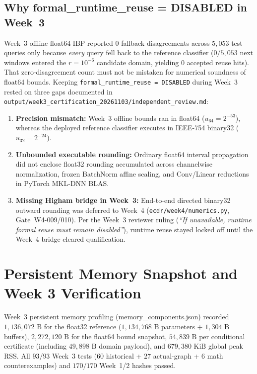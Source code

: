 \documentclass[11pt,oneside,a4paper]{report}
\newcommand{\code}[1]{{\small\upshape\ttfamily #1}}
\newcommand{\pathcode}[1]{{\small\upshape\ttfamily\nolinkurl{#1}}}
\theoremstyle{remark}
\begin{document}
\subsection{Why \code{formal\_runtime\_reuse = DISABLED} in Week~3}
Week~3 offline \code{float64} IBP reported $0$ fallback disagreements across $5{,}053$ test queries only because \emph{every} query fell back to the reference classifier ($0/5{,}053$ next windows entered the $r=10^{-6}$ candidate domain, yielding $0$ accepted reuse hits). That zero-disagreement count must not be mistaken for numerical soundness of \code{float64} bounds. Keeping \pathcode{formal_runtime_reuse = DISABLED} during Week~3 rested on three gaps documented in \pathcode{output/week3_certification_20261103/independent_review.md}:
\begin{enumerate}[leftmargin=1.5em]
  \item \textbf{Precision mismatch:} Week~3 offline bounds ran in \code{float64} ($u_{64} = 2^{-53}$), whereas the deployed reference classifier executes in IEEE-754 \code{binary32} ($u_{32} = 2^{-24}$).
  \item \textbf{Unbounded executable rounding:} Ordinary \code{float64} interval propagation did not enclose \code{float32} rounding accumulated across channelwise normalization, frozen BatchNorm affine scaling, and Conv/Linear reductions in PyTorch MKL-DNN BLAS.
  \item \textbf{Missing Higham bridge in Week~3:} End-to-end directed \code{binary32} outward rounding was deferred to Week~4 (\pathcode{ecdr/week4/numerics.py}, Gate~\code{W4-009/010}). Per the Week~3 reviewer ruling (\textit{``If unavailable, runtime formal reuse must remain disabled''}), runtime reuse stayed locked off until the Week~4 bridge cleared qualification.
\end{enumerate}

\section{Persistent Memory Snapshot and Week 3 Verification}
Week~3 persistent memory profiling (\code{memory\_components.json}) recorded $1{,}136{,}072\text{ B}$ for the \code{float32} reference ($1{,}134{,}768\text{ B}$ parameters + $1{,}304\text{ B}$ buffers), $2{,}272{,}120\text{ B}$ for the \code{float64} bound snapshot, $54{,}839\text{ B}$ per conditional certificate (including $49{,}898\text{ B}$ domain payload), and $679{,}380\text{ KiB}$ global peak RSS. All $93/93$ Week~3 tests ($60$ historical + $27$ actual-graph + $6$ math counterexamples) and $170/170$ Week~1/2 hashes passed.
\end{document}
